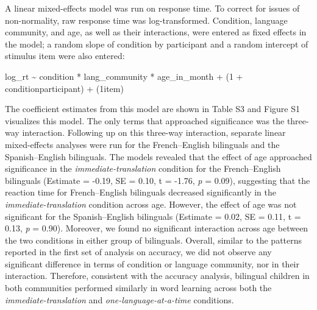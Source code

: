 \documentclass[
  man,floatsintext]{apa7}
\begin{document}
A linear mixed-effects model was run on response time. To correct for issues of non-normality, raw response time was log-transformed. Condition, language community, and age, as well as their interactions, were entered as fixed effects in the model; a random slope of condition by participant and a random intercept of stimulus item were also entered:

log\_rt \textasciitilde{} condition * lang\_community * age\_in\_month + (1 + condition\textbar participant) + (1\textbar item)

\noindent The coefficient estimates from this model are shown in Table S3 and Figure S1 visualizes this model. The only terms that approached significance was the three-way interaction. Following up on this three-way interaction, separate linear mixed-effects analyses were run for the French--English bilinguals and the Spanish--English bilinguals. The models revealed that the effect of age approached significance in the \emph{immediate-translation} condition for the French--English bilinguals (Estimate = -0.19, SE = 0.10, t = -1.76, \emph{p} = 0.09), suggesting that the reaction time for French--English bilinguals decreased significantly in the \emph{immediate-translation} condition across age. However, the effect of age was not significant for the Spanish--English bilinguals (Estimate = 0.02, SE = 0.11, t = 0.13, \emph{p} = 0.90). Moreover, we found no significant interaction across age between the two conditions in either group of bilinguals. Overall, similar to the patterns reported in the first set of analysis on accuracy, we did not observe any significant difference in terms of condition or language community, nor in their interaction. Therefore, consistent with the accuracy analysis, bilingual children in both communities performed similarly in word learning across both the \emph{immediate-translation} and \emph{one-language-at-a-time} conditions.
\end{document}

